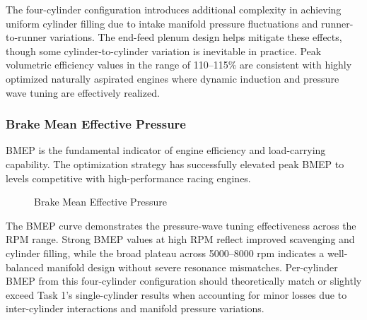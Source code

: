 The four-cylinder configuration introduces additional complexity in achieving uniform cylinder filling due to intake manifold pressure fluctuations and runner-to-runner variations. The end-feed plenum design helps mitigate these effects, though some cylinder-to-cylinder variation is inevitable in practice. Peak volumetric efficiency values in the range of 110--115\% are consistent with highly optimized naturally aspirated engines where dynamic induction and pressure wave tuning are effectively realized.

\subsubsection{Brake Mean Effective Pressure}

BMEP is the fundamental indicator of engine efficiency and load-carrying capability. The optimization strategy has successfully elevated peak BMEP to levels competitive with high-performance racing engines.

\begin{figure}[H]
    \centering
    \begin{minipage}{\textwidth}
        \centering
        \caption{Brake Mean Effective Pressure}
        \label{fig:task2_bmep_detail}
    \end{minipage}
\end{figure}

The BMEP curve demonstrates the pressure-wave tuning effectiveness across the RPM range. Strong BMEP values at high RPM reflect improved scavenging and cylinder filling, while the broad plateau across 5000--8000 rpm indicates a well-balanced manifold design without severe resonance mismatches. Per-cylinder BMEP from this four-cylinder configuration should theoretically match or slightly exceed Task 1's single-cylinder results when accounting for minor losses due to inter-cylinder interactions and manifold pressure variations.

